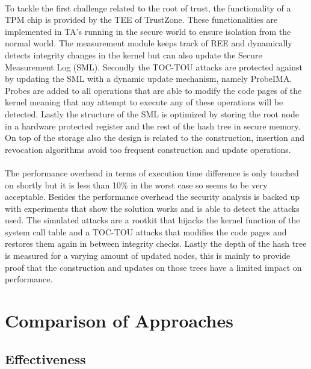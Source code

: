 \paragraph*{}
To tackle the first challenge related to the root of trust, the functionality of a TPM chip is provided by the TEE of TrustZone. These functionalities are implemented in TA's running in the secure world to ensure isolation from the normal world. The measurement module keeps track of REE and dynamically detects integrity changes in the kernel but can also update the Secure Measurement Log (SML). Secondly the TOC-TOU attacks are protected against by updating the SML with a dynamic update mechanism, namely ProbeIMA. Probes are added to all operations that are able to modify the code pages of the kernel meaning that any attempt to execute any of these operations will be detected. Lastly the structure of the SML is optimized by storing the root node in a hardware protected register and the rest of the hash tree in secure memory. On top of the storage also the design is related to the construction, insertion and revocation algorithms avoid too frequent construction and update operations.

\paragraph*{}
The performance overhead in terms of execution time difference is only touched on shortly but it is less than 10\% in the worst case so seems to be very acceptable. Besides the performance overhead the security analysis is backed up with experiments that show the solution works and is able to detect the attacks used. The simulated attacks are a rootkit that hijacks the kernel function of the system call table and a TOC-TOU attacks that modifies the code pages and restores them again in between integrity checks. Lastly the depth of the hash tree is measured for a varying amount of updated nodes, this is mainly to provide proof that the construction and updates on those trees have a limited impact on performance.

\section{Comparison of Approaches}

\subsection*{Effectiveness}

